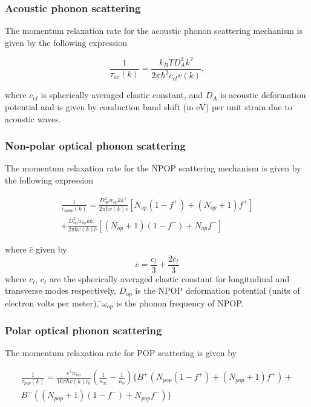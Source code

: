 \documentclass[12pt]{article}
\begin{document}
\subsubsection{Acoustic phonon scattering}
The momentum relaxation rate for the acoustic phonon scattering mechanism is given by the following expression \cite{ramu2011thermoelectric}

\begin{equation}
\frac{1}{\tau_{ac}(k)} = \frac{k_B T D_A^2 k^2}{2\pi\hbar^2 c_{el}v(k)} ,
\label{acoustic_deformation_p}
\end{equation}

where $c_{el}$ is spherically averaged elastic constant, and $D_A$ is acoustic deformation potential and is given by conduction band shift (in eV) per unit strain due to acoustic waves.

\subsubsection{Non-polar optical phonon scattering}
The momentum relaxation rate for the NPOP scattering mechanism is given by the following expression \cite{ramu2011thermoelectric} 

\begin{multline}
\frac{1}{\tau_{npop}(k)} = \frac{D_{op}^2 w_{op}kk^+}{2\pi \hbar v(k) \bar{c}} \left[ N_{op}(1-f^+) + (N_{op}+1) f^+ \right] \\ + \frac{D_{op}^2 w_{op}kk^-}{2\pi \hbar v(k) \bar{c}} \left[ (N_{op}+1)(1-f^-) + N_{op} f^- \right]
\label{npop_p}
\end{multline}

where $\bar{c}$  given by
\begin{equation}
\bar{c} = \frac{c_l}{3}  + \frac{2 c_t}{3}
\label{c_bar}
\end{equation}  
where $c_l$, $c_t$ are the spherically averaged elastic
constant for longitudinal and transverse modes respectively, $D_{op}$ is the NPOP deformation potential (units of electron volts per meter),  ̄$\omega_{op}$  is the phonon frequency of NPOP.

\subsubsection{Polar optical phonon scattering}
The momentum relaxation rate for POP scattering is given by \cite{ramu2011thermoelectric} 

\begin{multline}
\frac{1}{\tau_{pop}(k)} =  \frac{e^2 w_{op}}{16\pi \hbar v(k) \epsilon_0}  \left( \frac{1}{\kappa_\infty} - \frac{1}{\kappa_0} \right) \{ B^+  \left( N_{pop}(1-f^+) + (N_{pop} +1) f^+ \right) + \\ B^- \left( (N_{pop}+1)(1-f^-) + N_{pop} f^- \right) \}
\label{pop_p}
\end{multline}
\end{document}

